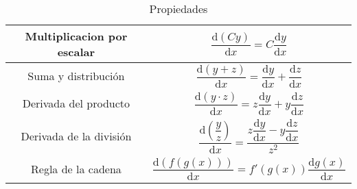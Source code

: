 \begin{table}[h]
    \centering
    \begin{tabular}{|c|c|}
    \hline
     Multiplicacion por escalar    &  $\dfrac {\mathrm{d} (Cy)}{\mathrm{d} x}=C \dfrac {\mathrm{d} y}{\mathrm{d} x}$   \\ \hline
    Suma y distribución     & $\dfrac {\mathrm{d} (y+z)}{\mathrm{d} x}=\dfrac {\mathrm{d} y}{\mathrm{d} x}+\dfrac {\mathrm{d} z}{\mathrm{d} x}$\\ \hline
    Derivada del producto  &   $\dfrac {\mathrm{d} (y \cdot z)}{\mathrm{d} x}=z\dfrac {\mathrm{d} y}{\mathrm{d} x}+y\dfrac {\mathrm{d} z}{\mathrm{d} x}$ \\ \hline
    Derivada de la división  & $\dfrac {\mathrm{d} (\dfrac yz)}{\mathrm{d} x}=\dfrac {z\dfrac {\mathrm{d} y}{\mathrm{d} x}-y\dfrac {\mathrm{d} z}{\mathrm{d} x}}{z^2}$\\ \hline
    Regla de la cadena & $\dfrac {\mathrm{d} (f(g(x)))}{\mathrm{d} x}=f'(g(x))\dfrac {\mathrm{d} g(x)}{\mathrm{d} x}$\\ \hline
    \end{tabular}
    \caption{Propiedades}
\end{table}